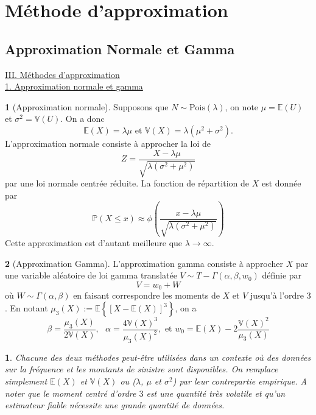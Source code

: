 \documentclass[8pt,notheorems]{beamer}
\def \E{\mathbb E}
\def \P {\mathbb P}
\def \V{\mathbb V}
\newtheorem{remark}{\translate{Remark}}
\theoremstyle{definition}
\newtheorem{definition}{\translate{Definition}}
\theoremstyle{example}
\theoremstyle{mystyle}
\theoremstyle{plain}
\begin{document}
\section{Méthode d'approximation}
\subsection{Approximation Normale et Gamma}
\begin{frame}[allowframebreaks]
\underline{III. Méthodes d'approximation}\\
\underline{1. Approximation normale et gamma}\\
\begin{definition}[Approximation normale]
Supposons que $N\sim\text{Pois}(\lambda)$, on note $\mu = \E(U)$ et $\sigma^2 = \V(U)$. On a donc
$$
\E(X) = \lambda\mu\text{ et }\V(X) = \lambda(\mu^2+\sigma^2).
$$
L'approximation normale consiste à approcher la loi de
$$
Z = \frac{X-\lambda \mu}{\sqrt{\lambda(\sigma^2+\mu^2)}}
$$
par une loi normale centrée réduite. La fonction de répartition de $X$ est donnée par
$$
\P(X\leq x) \approx \phi\left(\frac{x-\lambda\mu}{\sqrt{\lambda(\sigma^2+\mu^2)}}\right)
$$
Cette approximation est d'autant meilleure que $\lambda\rightarrow \infty$.
\end{definition}

\begin{definition}[Approximation Gamma]
L'approximation gamma consiste à approcher $X$ par une variable aléatoire de loi gamma translatée $V\sim T-\Gamma(\alpha,\beta, w_0)$ définie par
$$
V = w_0 + W
$$
où $W\sim \Gamma(\alpha, \beta)$ en faisant correspondre les moments de $X$ et $V$ jusqu'à l'ordre $3$.  En notant $\mu_3(X) :=\E\left\{[X-\E(X)]^3\right\}$, on a
$$
\beta = \frac{\mu_3(X)}{2\V(X)},\text{ }\alpha = \frac{4\V(X)^3}{\mu_3(X)^2},\text{ et }w_0 = \E(X) - 2\frac{\V(X)^2}{\mu_3(X)}
$$
\end{definition}
\begin{remark}
Chacune des deux méthodes peut-être utilisées dans un contexte où des données sur la fréquence et les montants de sinistre sont disponibles. On remplace simplement $\E(X)$ et $\V(X)$ ou ($\lambda$, $\mu$ et $\sigma^2$) par leur contrepartie empirique. A noter que le moment centré d'ordre $3$ est une quantité très volatile et qu'un estimateur fiable nécessite une grande quantité de données.
\end{remark}

\end{frame}
\end{document}
